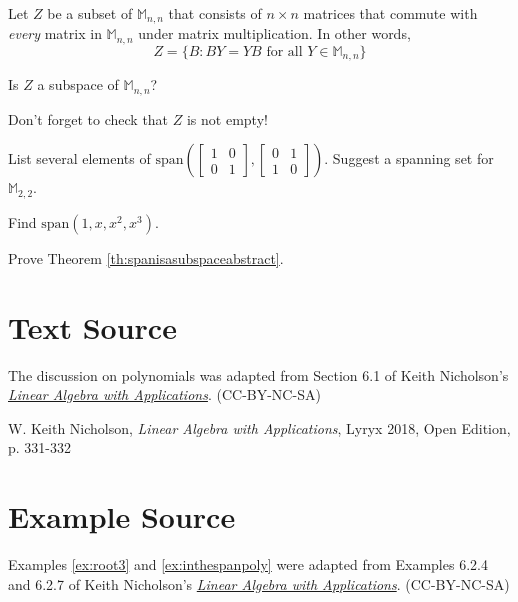 \documentclass{ximera}
\begin{document}
\begin{problem}\label{prob:abstractvectspace8}
Let $Z$ be a subset of $\mathbb{M}_{n,n}$ that consists of $n\times n$ matrices that commute with {\it every} matrix in $\mathbb{M}_{n,n}$ under matrix multiplication. In other words,
$$Z=\{B : BY=YB \mbox{ for all } Y \in \mathbb{M}_{n,n}\}$$

Is $Z$ a subspace of $\mathbb{M}_{n,n}$?

\begin{hint}
Don't forget to check that $Z$ is not empty!
\end{hint}
\end{problem}

\begin{problem}\label{prob:abstractvectspace9}
List several elements of $\mbox{span}\left(\begin{bmatrix}1&0\\0&1\end{bmatrix}, \begin{bmatrix}0&1\\1&0\end{bmatrix}\right)$.  Suggest a spanning set for $\mathbb{M}_{2,2}$.
\end{problem}

\begin{problem}\label{prob:abstractvectspace10}
Find $\mbox{span}(1, x, x^2, x^3)$.
\end{problem}

\begin{problem}\label{prob:spanisasubspaceabstract}
Prove Theorem \ref{th:spanisasubspaceabstract}.
\end{problem}

\section*{Text Source} The discussion on polynomials was adapted from Section 6.1 of Keith Nicholson's \href{https://open.umn.edu/opentextbooks/textbooks/linear-algebra-with-applications}{\it Linear Algebra with Applications}. (CC-BY-NC-SA)

W. Keith Nicholson, {\it Linear Algebra with Applications}, Lyryx 2018, Open Edition, p. 331-332 

\section*{Example Source}
Examples \ref{ex:root3} and \ref{ex:inthespanpoly} were adapted from Examples 6.2.4 and 6.2.7 of Keith Nicholson's \href{https://open.umn.edu/opentextbooks/textbooks/linear-algebra-with-applications}{\it Linear Algebra with Applications}. (CC-BY-NC-SA)
\end{document}
